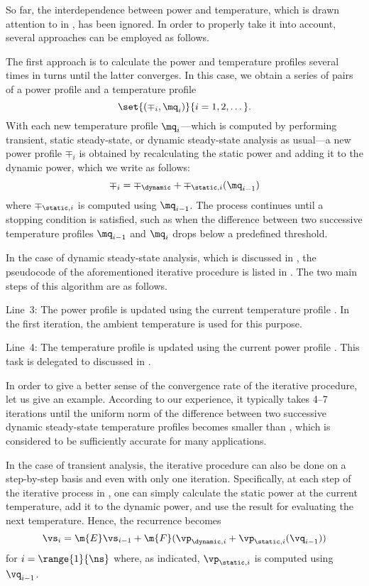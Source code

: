 So far, the interdependence between power and temperature, which is drawn
attention to in , has been ignored. In order to properly take
it into account, several approaches can be employed as follows.

The first approach is to calculate the power and temperature profiles several
times in turns until the latter converges. In this case, we obtain a series of
pairs of a power profile and a temperature profile
\[
  \set{(\mp_i, \mq_i)}{i = 1, 2, \dots}.
\]
With each new temperature profile $\mq_i$---which is computed by performing
transient, static steady-state, or dynamic steady-state analysis as usual---a
new power profile $\mp_i$ is obtained by recalculating the static power and
adding it to the dynamic power, which we write as follows:
\[
  \mp_i = \mp_\dynamic + \mp_{\static, i}(\mq_{i - 1})
\]
where $\mp_{\static, i}$ is computed using $\mq_{i - 1}$. The process continues
until a stopping condition is satisfied, such as when the difference between two
successive temperature profiles $\mq_{i - 1}$ and $\mq_i$ drops below a
predefined threshold.

In the case of dynamic steady-state analysis, which is discussed in
, the pseudocode of the aforementioned iterative
procedure is listed in . The two
main steps of this algorithm are as follows.

Line~3: The power profile \mp is updated using the current temperature profile
\mq. In the first iteration, the ambient temperature is used for this purpose.

Line~4: The temperature profile \mq is updated using the current power profile
\mp. This task is delegated to  discussed in
.

In order to give a better sense of the convergence rate of the iterative
procedure, let us give an example. According to our experience, it typically
takes 4--7 iterations until the uniform norm of the difference between two
successive dynamic steady-state temperature profiles becomes smaller than
, which is considered to be sufficiently accurate for many
applications.

In the case of transient analysis, the iterative procedure can also be done on a
step-by-step basis and even with only one iteration. Specifically, at each step
of the iterative process in , one can simply
calculate the static power at the current temperature, add it to the dynamic
power, and use the result for evaluating the next temperature. Hence, the
recurrence becomes
\[
  \vs_i = \m{E} \vs_{i - 1} + \m{F} (\vp_{\dynamic, i} + \vp_{\static, i}(\vq_{i - 1}))
\]
for $i = \range{1}{\ns}$ where, as indicated, $\vp_{\static, i}$ is computed
using $\vq_{i - 1}$.


